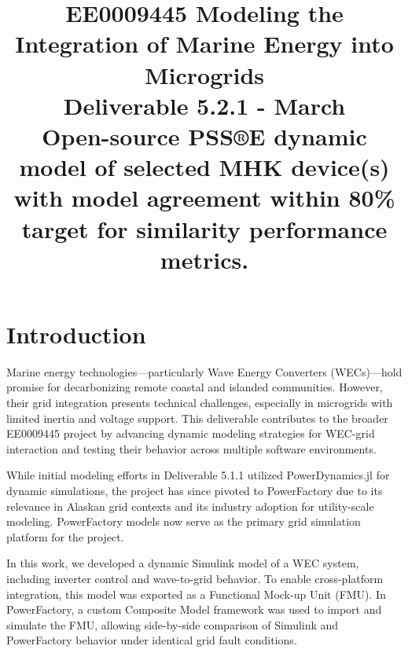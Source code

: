 \documentclass[conference]{IEEEtran}
\begin{document}
\title{EE0009445 Modeling the Integration of Marine Energy into Microgrids\\

\vspace{10pt}
\footnotesize{Deliverable 5.2.1 - March \\ Open-source PSS®E dynamic model of selected MHK device(s) with model agreement within 80\% target for similarity performance metrics.}}

\maketitle






\section*{Introduction}

    Marine energy technologies—particularly Wave Energy Converters (WECs)—hold promise for decarbonizing remote coastal and islanded communities. However, their grid integration presents technical challenges, especially in microgrids with limited inertia and voltage support. This deliverable contributes to the broader EE0009445 project by advancing dynamic modeling strategies for WEC-grid interaction and testing their behavior across multiple software environments.
    
    While initial modeling efforts in Deliverable 5.1.1 utilized PowerDynamics.jl for dynamic simulations, the project has since pivoted to PowerFactory due to its relevance in Alaskan grid contexts and its industry adoption for utility-scale modeling. PowerFactory models now serve as the primary grid simulation platform for the project.
    
    In this work, we developed a dynamic Simulink model of a WEC system, including inverter control and wave-to-grid behavior. To enable cross-platform integration, this model was exported as a Functional Mock-up Unit (FMU). In PowerFactory, a custom Composite Model framework was used to import and simulate the FMU, allowing side-by-side comparison of Simulink and PowerFactory behavior under identical grid fault conditions.
    
\end{document}
